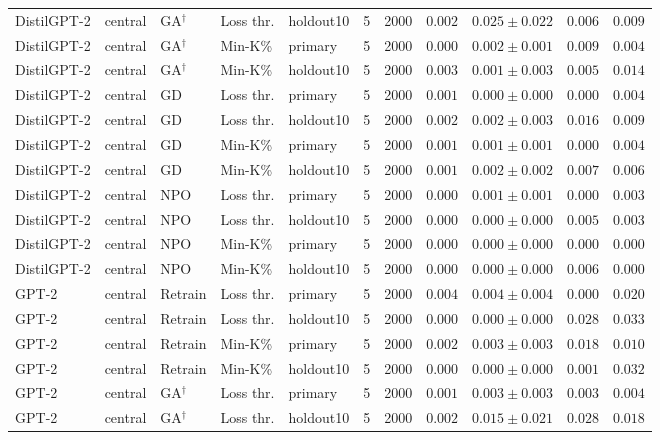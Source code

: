 {\begin{longtable}{@{\extracolsep{\fill}}lllllcccccc@{}}
DistilGPT-2 & central & GA$^{\dagger}$ & Loss thr. & holdout10 & 5 & 2000 & $0.002$ & $0.025 \pm 0.022$ & $0.006$ & $0.009$ \\
DistilGPT-2 & central & GA$^{\dagger}$ & Min-K\% & primary & 5 & 2000 & $0.000$ & $0.002 \pm 0.001$ & $0.009$ & $0.004$ \\
DistilGPT-2 & central & GA$^{\dagger}$ & Min-K\% & holdout10 & 5 & 2000 & $0.003$ & $0.001 \pm 0.003$ & $0.005$ & $0.014$ \\
DistilGPT-2 & central & GD & Loss thr. & primary & 5 & 2000 & $0.001$ & $0.000 \pm 0.000$ & $0.000$ & $0.004$ \\
DistilGPT-2 & central & GD & Loss thr. & holdout10 & 5 & 2000 & $0.002$ & $0.002 \pm 0.003$ & $0.016$ & $0.009$ \\
DistilGPT-2 & central & GD & Min-K\% & primary & 5 & 2000 & $0.001$ & $0.001 \pm 0.001$ & $0.000$ & $0.004$ \\
DistilGPT-2 & central & GD & Min-K\% & holdout10 & 5 & 2000 & $0.001$ & $0.002 \pm 0.002$ & $0.007$ & $0.006$ \\
DistilGPT-2 & central & NPO & Loss thr. & primary & 5 & 2000 & $0.000$ & $0.001 \pm 0.001$ & $0.000$ & $0.003$ \\
DistilGPT-2 & central & NPO & Loss thr. & holdout10 & 5 & 2000 & $0.000$ & $0.000 \pm 0.000$ & $0.005$ & $0.003$ \\
DistilGPT-2 & central & NPO & Min-K\% & primary & 5 & 2000 & $0.000$ & $0.000 \pm 0.000$ & $0.000$ & $0.000$ \\
DistilGPT-2 & central & NPO & Min-K\% & holdout10 & 5 & 2000 & $0.000$ & $0.000 \pm 0.000$ & $0.006$ & $0.000$ \\
GPT-2 & central & Retrain & Loss thr. & primary & 5 & 2000 & $0.004$ & $0.004 \pm 0.004$ & $0.000$ & $0.020$ \\
GPT-2 & central & Retrain & Loss thr. & holdout10 & 5 & 2000 & $0.000$ & $0.000 \pm 0.000$ & $0.028$ & $0.033$ \\
GPT-2 & central & Retrain & Min-K\% & primary & 5 & 2000 & $0.002$ & $0.003 \pm 0.003$ & $0.018$ & $0.010$ \\
GPT-2 & central & Retrain & Min-K\% & holdout10 & 5 & 2000 & $0.000$ & $0.000 \pm 0.000$ & $0.001$ & $0.032$ \\
GPT-2 & central & GA$^{\dagger}$ & Loss thr. & primary & 5 & 2000 & $0.001$ & $0.003 \pm 0.003$ & $0.003$ & $0.004$ \\
GPT-2 & central & GA$^{\dagger}$ & Loss thr. & holdout10 & 5 & 2000 & $0.002$ & $0.015 \pm 0.021$ & $0.028$ & $0.018$ \\

\end{longtable}}
